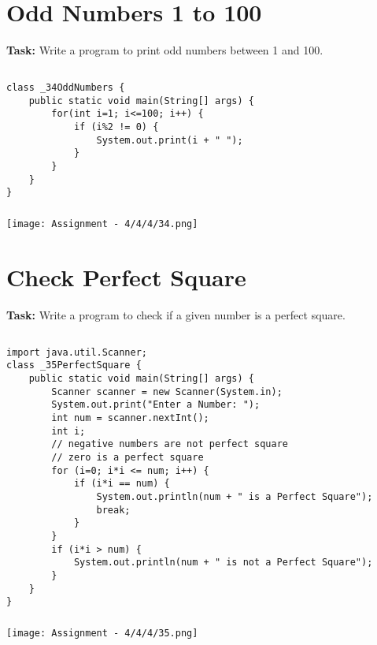 \documentclass[12pt,a4paper]{article}
\begin{document}

\section{Odd Numbers 1 to 100}
\textbf{Task:} Write a program to print odd numbers between 1 and 100.

\subsection{}
\begin{lstlisting}
class _34OddNumbers {
    public static void main(String[] args) {
        for(int i=1; i<=100; i++) {
            if (i%2 != 0) {
                System.out.print(i + " ");
            }
        }
    }
}
\end{lstlisting}

\subsubsection{}
\begin{center}
    \texttt{[image: Assignment - 4/4/4/34.png]}
\end{center}


\section{Check Perfect Square}
\textbf{Task:} Write a program to check if a given number is a perfect square.

\subsection{}
\begin{lstlisting}
import java.util.Scanner;
class _35PerfectSquare {
    public static void main(String[] args) {
        Scanner scanner = new Scanner(System.in);
        System.out.print("Enter a Number: ");
        int num = scanner.nextInt();
        int i;
        // negative numbers are not perfect square
        // zero is a perfect square
        for (i=0; i*i <= num; i++) {
            if (i*i == num) {
                System.out.println(num + " is a Perfect Square");
                break;
            }
        }
        if (i*i > num) {
            System.out.println(num + " is not a Perfect Square");
        }
    }
}
\end{lstlisting}

\subsubsection{}
\begin{center}
    \texttt{[image: Assignment - 4/4/4/35.png]}
\end{center}
\end{document}
